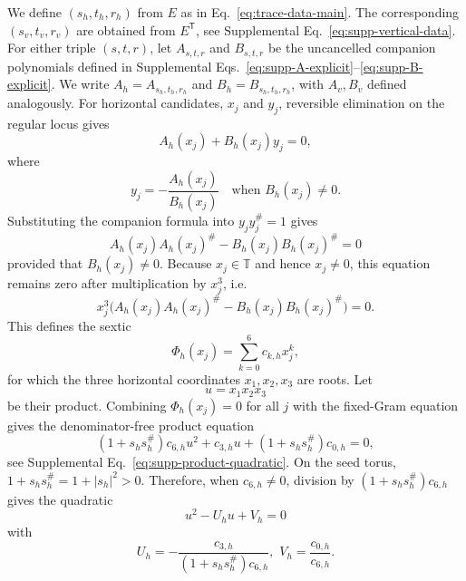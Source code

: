 \documentclass[aps,prx,reprint,nofootinbib,twoside,superscriptaddress,longbibliography,floatfix]{revtex4-2}
\theoremstyle{definition}
\newcommand{\T}{\mathbb T}
\begin{document}
We define $(s_h,t_h,r_h)$ from $E$ as in Eq.~\eqref{eq:trace-data-main}. The corresponding $(s_v,t_v,r_v)$ are obtained from $E^{\mathsf T}$, see Supplemental Eq.~\eqref{eq:supp-vertical-data}. 
For either triple $(s,t,r)$, let $A_{s,t,r}$ and $B_{s,t,r}$ be the uncancelled companion polynomials defined in Supplemental Eqs.~\eqref{eq:supp-A-explicit}--\eqref{eq:supp-B-explicit}. We write $A_h=A_{s_h,t_h,r_h}$ and $B_h=B_{s_h,t_h,r_h}$, with $A_v,B_v$ defined analogously. For horizontal candidates, $x_j$ and $y_j$, reversible elimination on the regular locus gives
\begin{equation}
A_h(x_j)+B_h(x_j)y_j=0,
\label{eq:regular-companion-relation}
\end{equation}
where 
\begin{equation}
    y_j=-\frac{A_h(x_j)}{B_h(x_j)}\quad\text{when }B_h(x_j)\neq0.
\end{equation}
Substituting the companion formula into $y_jy_j^\#=1$ gives
\begin{equation}
A_h(x_j)A_h(x_j)^\#-B_h(x_j)B_h(x_j)^\#=0
\label{eq:horizontal-companion-phase-condition}
\end{equation}
provided that $B_h(x_j)\neq0$. 
Because $x_j\in\T$ and hence $x_j\neq0$, this equation remains zero after multiplication by $x_j^3$, i.e. 
\begin{equation}x_{j}^3\bigl(A_h(x_j)A_h(x_j)^\#-B_h(x_j)B_h(x_j)^\#\bigr) = 0.
\label{eq:horizontal-fundamental-sextic}
\end{equation}
This defines the sextic
\begin{equation}
  \Phi_h(x_{j})  =\sum_{k=0}^{6}c_{k,h}x_j^k,
\end{equation}
for which the three horizontal coordinates $x_1,x_2,x_3$ are roots.
Let
\begin{equation}
u=x_1x_2x_3
\label{eq:u}
\end{equation}
be their product. Combining $\Phi_h(x_j) = 0$ for all $j$ with the fixed-Gram equation gives the denominator-free product equation
\begin{equation}
(1+s_hs_h^\#)c_{6,h}u^2+c_{3,h}u+(1+s_hs_h^\#)c_{0,h}=0,
\end{equation}
see Supplemental Eq.~\eqref{eq:supp-product-quadratic}.
On the seed torus, $1+s_hs_h^\#=1+|s_h|^2>0$. Therefore, when $c_{6,h}\neq0$, division by $(1+s_hs_h^\#)c_{6,h}$ gives the quadratic
\begin{equation}
u^2-U_hu+V_h=0
\label{eq:horizontal-product-quadratic}
\end{equation}
with
\begin{equation}
    U_h=-\frac{c_{3,h}}{(1+s_hs_h^\#)c_{6,h}},
\,\,
V_h=\frac{c_{0,h}}{c_{6,h}}.
\end{equation}
\end{document}
